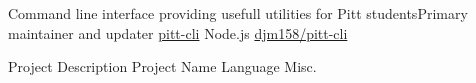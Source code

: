 
\vspace{-1mm}
\begin{cventries}

  \cventrywork
    {Command line interface providing usefull utilities for Pitt students{\enskip\cdotp\enskip}Primary maintainer and updater} %
    {\href{https://www.npmjs.com/package/pitt-cli}{pitt-cli}} %
    {Node.js} %
    {\href{https://github.com/djm158/pitt-cli}{\faGithub \hspace{0.5mm} djm158/pitt-cli}} %

  \vspace{1mm}

  \cventrywork
    {Project Description} %
    {Project Name} %
    {Language} %
    {Misc.} %
    
  \vspace{-5mm}

\end{cventries}
